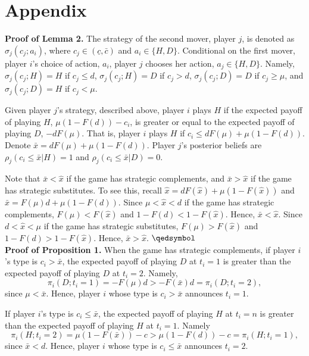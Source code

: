 \documentclass[12pt,english]{article}
\begin{document}
\section*{Appendix}
\doublespacing
\noindent \textbf{Proof of Lemma 2.} The strategy of the second mover, player $j$, is denoted as  $\sigma_j(c_j; a_i)$, where $c_j \in (\underline{c}, \bar{c})$ and $a_i \in \{H,D\}$. Conditional on the first mover, player $i$'s choice of action, $a_i$, player $j$ chooses her action, $a_j \in \{H,D\}$. Namely, $\sigma_j(c_j; H)=H$ if $c_j \leq d$, $\sigma_j(c_j; H)=D$ if $c_j > d$, $\sigma_j(c_j; D)=D$ if $c_j \geq \mu$, and $\sigma_j(c_j; D)=H$ if $c_j < \mu$. \par 
Given player $j$'s strategy, described above, player $i$ plays $H$ if the expected payoff of playing $H$, $\mu (1-F(d))-c_i$, is greater or equal to the expected payoff of playing $D$, $-dF(\mu)$. That is, player $i$ plays $H$ if $c_i \leq dF(\mu)+\mu(1-F(d))$. Denote $\bar{x}=dF(\mu)+\mu(1-F(d))$. Player $j$'s posterior beliefs are $\rho_j(c_i\leq \bar{x}|H)=1$ and $\rho_j(c_i \leq \bar{x} |D)=0$. \par
Note that $\bar{x}<\hat{x}$ if the game has strategic complements, and $\bar{x}>\hat{x}$ if the game has strategic substitutes. To see this, recall $\hat{x}=dF(\hat{x})+\mu(1-F(\hat{x}))$ and $\bar{x}=F(\mu)d+\mu(1-F(d))$. Since $\mu<\hat{x}<d$ if the game has strategic complements, $F(\mu)<F(\hat{x})$ and $1-F(d)<1-F(\hat{x})$. Hence, $\bar{x}<\hat{x}$. Since $d<\hat{x}<\mu$ if the game has strategic substitutes, $F(\mu)>F(\hat{x})$ and $1-F(d)>1-F(\hat{x})$. Hence, $\bar{x}>\hat{x}$.
$\qedsymbol$ \\
\noindent \textbf{Proof of Proposition 1.} When the game has strategic complements, if player $i$'s type is $c_i>\bar{x}$, the expected payoff of playing $D$ at $t_i=1$ is greater than the expected payoff of playing $D$ at $t_i=2$. Namely,
\begin{equation}
    \pi_i(D;t_i=1)=-F(\mu)d > -F(\bar{x})d=\pi_i(D;t_i=2),
\end{equation}
since $\mu<\bar{x}$. Hence, player $i$ whose type is $c_i>\bar{x}$ announces $t_i=1$.\par
If player $i$'s type is $c_i \leq \bar{x}$, the expected payoff of playing $H$ at $t_i=n$ is greater than the expected payoff of playing $H$ at $t_i=1$. Namely
\begin{equation}
       \pi_i(H;t_i=2)=\mu(1-F(\bar{x}))-c > \mu(1-F(d))-c=\pi_i(H;t_i=1),
\end{equation}
since $\bar{x}<d$. Hence, player $i$ whose type is $c_i\leq\bar{x}$ announces $t_i=2$. \par 
\end{document}
